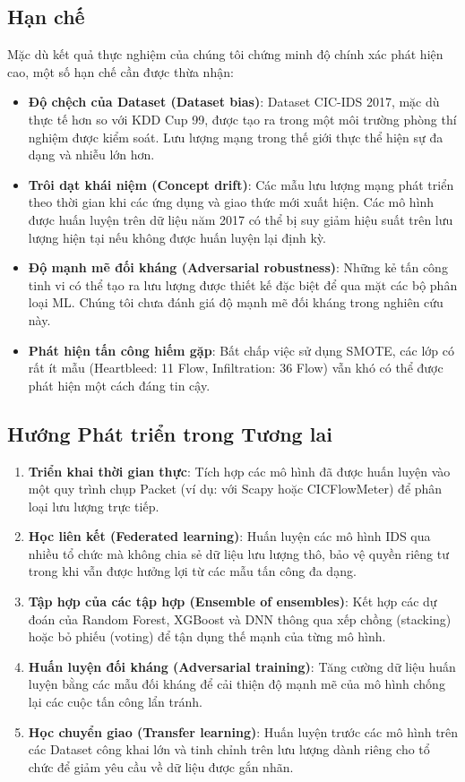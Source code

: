 \subsection{Hạn chế}

Mặc dù kết quả thực nghiệm của chúng tôi chứng minh độ chính xác phát hiện cao, một số hạn chế cần được thừa nhận:

\begin{itemize}
    \item \textbf{Độ chệch của Dataset (Dataset bias)}: Dataset CIC-IDS 2017, mặc dù thực tế hơn so với KDD Cup 99, được tạo ra trong một môi trường phòng thí nghiệm được kiểm soát. Lưu lượng mạng trong thế giới thực thể hiện sự đa dạng và nhiễu lớn hơn.
    \item \textbf{Trôi dạt khái niệm (Concept drift)}: Các mẫu lưu lượng mạng phát triển theo thời gian khi các ứng dụng và giao thức mới xuất hiện. Các mô hình được huấn luyện trên dữ liệu năm 2017 có thể bị suy giảm hiệu suất trên lưu lượng hiện tại nếu không được huấn luyện lại định kỳ.
    \item \textbf{Độ mạnh mẽ đối kháng (Adversarial robustness)}: Những kẻ tấn công tinh vi có thể tạo ra lưu lượng được thiết kế đặc biệt để qua mặt các bộ phân loại ML. Chúng tôi chưa đánh giá độ mạnh mẽ đối kháng trong nghiên cứu này.
    \item \textbf{Phát hiện tấn công hiếm gặp}: Bất chấp việc sử dụng SMOTE, các lớp có rất ít mẫu (Heartbleed: 11 Flow, Infiltration: 36 Flow) vẫn khó có thể được phát hiện một cách đáng tin cậy.
\end{itemize}

\subsection{Hướng Phát triển trong Tương lai}

\begin{enumerate}
    \item \textbf{Triển khai thời gian thực}: Tích hợp các mô hình đã được huấn luyện vào một quy trình chụp Packet (ví dụ: với Scapy hoặc CICFlowMeter) để phân loại lưu lượng trực tiếp.
    \item \textbf{Học liên kết (Federated learning)}: Huấn luyện các mô hình IDS qua nhiều tổ chức mà không chia sẻ dữ liệu lưu lượng thô, bảo vệ quyền riêng tư trong khi vẫn được hưởng lợi từ các mẫu tấn công đa dạng.
    \item \textbf{Tập hợp của các tập hợp (Ensemble of ensembles)}: Kết hợp các dự đoán của Random Forest, XGBoost và DNN thông qua xếp chồng (stacking) hoặc bỏ phiếu (voting) để tận dụng thế mạnh của từng mô hình.
    \item \textbf{Huấn luyện đối kháng (Adversarial training)}: Tăng cường dữ liệu huấn luyện bằng các mẫu đối kháng để cải thiện độ mạnh mẽ của mô hình chống lại các cuộc tấn công lẩn tránh.
    \item \textbf{Học chuyển giao (Transfer learning)}: Huấn luyện trước các mô hình trên các Dataset công khai lớn và tinh chỉnh trên lưu lượng dành riêng cho tổ chức để giảm yêu cầu về dữ liệu được gắn nhãn.
\end{enumerate}
